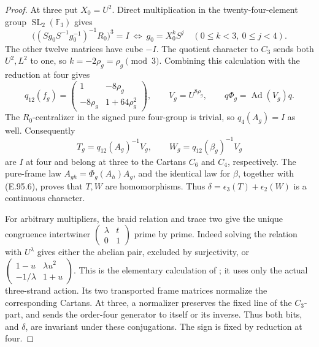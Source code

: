 \begin{proof}
At three put \(X_0=U^2\).  Direct multiplication in the
twenty-four-element group \(\operatorname{SL}_2(\mathbb F_3)\)
gives
\[
 \bigl((Sg_0S^{-1}g_0^{-1})^{-1}R_0\bigr)^3=I
 \ \Longleftrightarrow\
 g_0=X_0^kS^j\quad(0\le k<3,\ 0\le j<4).
                                                        \tag{E.95.5}
\]
The other twelve matrices have cube \(-I\).
The quotient character to \(C_3\) sends both \(U^2,L^2\) to
one, so \(k=-2\rho_g=\rho_g\pmod3\).
Combining this calculation with the reduction at four gives
\[
 q_{12}(f_g)=
 \begin{pmatrix}1&-8\rho_g\\-8\rho_g&1+64\rho_g^2\end{pmatrix},
 \qquad V_g=U^{8\rho_g},\qquad q\Phi_g=\operatorname{Ad}(V_g)q.
                                                        \tag{E.95.6}
\]
The \(R_0\)-centralizer in the signed pure four-group is trivial,
so \(q_4(A_g)=I\) as well.  Consequently
\[
 T_g=q_{12}(A_g)^{-1}V_g,\qquad
 W_g=q_{12}(\beta_g)^{-1}V_g
                                                        \tag{E.95.7}
\]
are \(I\) at four and belong at three to the Cartans \(C_6\)
and \(C_4\), respectively.
The pure-frame law
\(A_{gh}=\Phi_g(A_h)A_g\), and the identical law for \(\beta\),
together with (E.95.6), proves that \(T,W\) are homomorphisms.
Thus \(\delta=\epsilon_3(T)+\epsilon_2(W)\) is a continuous
character.

For arbitrary multipliers, the braid relation and trace two
give the unique congruence intertwiner
\(\left(\begin{smallmatrix}\lambda&t\\0&1\end{smallmatrix}\right)\)
prime by prime.  Indeed solving the relation with
\(U^\lambda\) gives either the abelian pair, excluded by
surjectivity, or
\(\left(\begin{smallmatrix}1-u&\lambda u^2\\-1/\lambda&1+u
\end{smallmatrix}\right)\).
This is the elementary calculation of
\citet[Lemmas~4.1--4.3, pp.774--776]{SymMarin2008};
it uses only the actual three-strand action.
Its two transported frame matrices normalize the corresponding
Cartans.  At three, a normalizer preserves the fixed line of
the \(C_3\)-part, and sends the order-four generator to itself
or its inverse.  Thus both bits, and \(\delta\), are invariant
under these conjugations.  The sign is fixed by reduction at four.


\end{proof}
